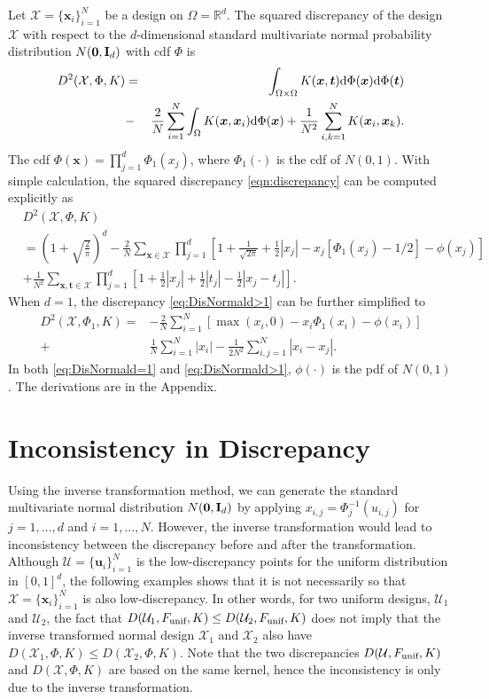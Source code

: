 \documentclass[graybox]{svmult}
\newcommand{\vx}{\boldsymbol{x}}
\newcommand{\vt}{\boldsymbol{t}}
\newcommand{\vu}{\boldsymbol{u}}
\newcommand{\dif}{{\rm d}}
\newcommand{\Udes}{\mathcal{U}}
\newcommand{\Xdes}{\mathcal{X}}
\newcommand{\unif}{\textup{unif}}
\begin{document}
Let $\Xdes = \{\vx_i\}_{i=1}^N$ be a design on $\Omega = \mathbb{R}^d$. 
The squared discrepancy of the design $\Xdes$ with respect to the $d$-dimensional standard multivariate normal probability distribution $N({\bf 0}, {\bf I}_d)$ with cdf $\Phi$ is
\begin{eqnarray}\label{eqn:discrepancy}\nonumber
D^2(\Xdes, \Phi, K) &=& \int_{\Omega\times\Omega} K(\vx,\vt)\dif \Phi(\vx)\dif \Phi(\vt)\\
&-&\frac{2}{N}\sum_{i=1}^N \int_{\Omega}K(\vx,\vx_i)\dif \Phi(\vx)+\frac{1}{N^2}\sum_{i,k=1}^N K(\vx_i,\vx_k).
\end{eqnarray}
The cdf $\Phi(\vx)=\prod_{j=1}^d \Phi_1(x_j)$, where $\Phi_1(\cdot)$ is the cdf of $N(0,1)$. 
With simple calculation, the squared discrepancy \eqref{eqn:discrepancy} can be  computed explicitly as
\begin{align}\label{eq:DisNormald>1}\nonumber
&D^2(\Xdes, \Phi, K)\\\nonumber
  &= \left(1+\sqrt{\frac{2}{\pi}}\right)^d - \frac{2}{N}\sum\limits_{\vx\in \Xdes} \prod\limits_{j=1}^d\left[ 1+\frac{1}{\sqrt{2\pi}}+\frac{1}{2}|x_j|-x_j[\Phi_1(x_j)-1/2]-\phi(x_j)\right]\\
  &+\frac{1}{N^2}\sum_{\vx,\vt\in \Xdes}\prod_{j=1}^d \left[1+\frac{1}{2}|x_j|+\frac{1}{2}|t_j|-\frac{1}{2}|x_j-t_j|\right]. 
\end{align}
When $d=1$, the discrepancy \eqref{eq:DisNormald>1} can be further simplified to
\begin{align}\label{eq:DisNormald=1}\nonumber
D^2(\Xdes, \Phi_1, K)=& -\frac{2}{N}\sum_{i=1}^N \left[\max(x_i,0)-x_i\Phi_1(x_i)-\phi(x_i)\right]\\
+&\frac{1}{N}\sum_{i=1}^N|x_i|-\frac{1}{2N^2}\sum_{i,j=1}^N|x_i-x_j|. 
\end{align}
In both \eqref{eq:DisNormald=1} and \eqref{eq:DisNormald>1}, $\phi(\cdot)$ is the pdf of $N(0,1)$. 
The derivations are in the Appendix. 

\section{Inconsistency in Discrepancy}\label{sec:inconsistency}
Using the inverse transformation method, we can generate the standard multivariate normal distribution $N({\bf 0},{\bf I}_d)$ by applying $x_{i,j}=\Phi^{-1}_j(u_{i,j})$ for $j=1,\ldots,d$ and $i=1,\ldots, N$. 
However, the inverse transformation would lead to inconsistency between the discrepancy before and after the transformation. 
Although $\Udes = \{\vu_i\}_{i=1}^N$ is the low-discrepancy points for the uniform distribution in $[0,1]^d$, the following examples shows that it is not necessarily so that $\Xdes=\{\vx_i\}_{i=1}^N$ is also low-discrepancy. 
In other words, for two uniform designs, $\Udes_1$ and $\Udes_2$, the fact that $D(\Udes_1,F_\unif, K)\leq D(\Udes_2,F_\unif, K)$ does not imply that the inverse transformed normal design $\Xdes_1$ and $\Xdes_2$ also have $D(\Xdes_1,\Phi, K)\leq D(\Xdes_2,\Phi, K)$. 
Note that the two discrepancies $D(\Udes, F_\unif, K)$ and $D(\Xdes, \Phi, K)$ are based on the same kernel, hence the inconsistency is only due to the inverse transformation. 
\end{document}
